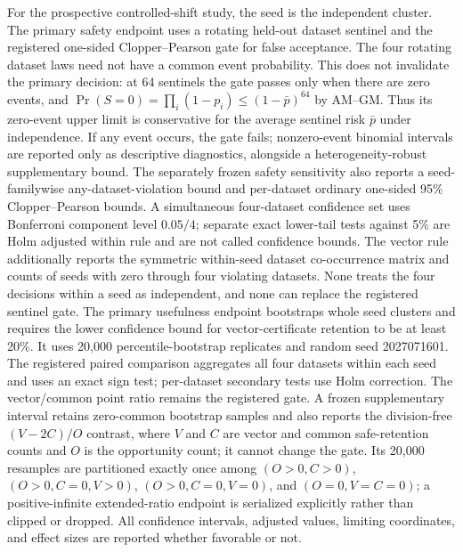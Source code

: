 For the prospective controlled-shift study, the seed is the independent
cluster. The primary safety endpoint uses a rotating held-out dataset sentinel
and the registered one-sided Clopper--Pearson gate for false acceptance. The
four rotating dataset laws need not have a common event probability. This does
not invalidate the primary decision: at 64 sentinels the gate passes only when
there are zero events, and
$\Pr(S=0)=\prod_i(1-p_i)\leq(1-\bar p)^{64}$ by AM--GM. Thus its zero-event
upper limit is conservative for the average sentinel risk $\bar p$ under
independence. If any event occurs, the gate fails; nonzero-event binomial
intervals are reported only as descriptive diagnostics, alongside a
heterogeneity-robust supplementary bound. The separately frozen safety
sensitivity also reports a seed-familywise any-dataset-violation bound and
per-dataset ordinary one-sided 95\% Clopper--Pearson bounds. A simultaneous
four-dataset confidence set uses Bonferroni component level $0.05/4$; separate
exact lower-tail tests against 5\% are Holm adjusted within rule and are not
called confidence bounds. The vector rule additionally reports the symmetric
within-seed dataset co-occurrence matrix and counts of seeds with zero through
four violating datasets. None treats the four decisions within a seed as
independent, and none can replace the registered sentinel gate. The
primary usefulness endpoint bootstraps whole seed clusters and requires the
lower confidence bound for vector-certificate retention to be at least 20\%.
It uses 20,000 percentile-bootstrap replicates and random seed 2027071601.
The registered paired comparison aggregates all four datasets within each seed
and uses an exact sign test; per-dataset secondary tests use Holm correction.
The vector/common point ratio remains the registered gate. A frozen
supplementary interval retains zero-common bootstrap samples and also reports
the division-free $(V-2C)/O$ contrast, where $V$ and $C$ are vector and common
safe-retention counts and $O$ is the opportunity count; it cannot change the
gate. Its 20,000 resamples are partitioned exactly once among
$(O>0,C>0)$, $(O>0,C=0,V>0)$, $(O>0,C=0,V=0)$, and $(O=0,V=C=0)$;
a positive-infinite extended-ratio endpoint is serialized explicitly rather
than clipped or dropped.
All confidence intervals, adjusted values, limiting coordinates, and effect
sizes are reported whether favorable or not.

